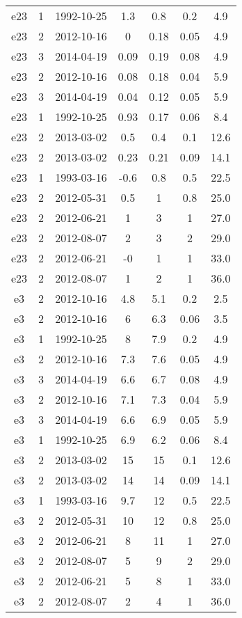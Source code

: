 \begin{table*}[htp]
\begin{tabular}{ccccccc}
e23 & 1 & 1992-10-25 & 1.3 & 0.8 & 0.2 & 4.9 \\
e23 & 2 & 2012-10-16 & 0 & 0.18 & 0.05 & 4.9 \\
e23 & 3 & 2014-04-19 & 0.09 & 0.19 & 0.08 & 4.9 \\
e23 & 2 & 2012-10-16 & 0.08 & 0.18 & 0.04 & 5.9 \\
e23 & 3 & 2014-04-19 & 0.04 & 0.12 & 0.05 & 5.9 \\
e23 & 1 & 1992-10-25 & 0.93 & 0.17 & 0.06 & 8.4 \\
e23 & 2 & 2013-03-02 & 0.5 & 0.4 & 0.1 & 12.6 \\
e23 & 2 & 2013-03-02 & 0.23 & 0.21 & 0.09 & 14.1 \\
e23 & 1 & 1993-03-16 & -0.6 & 0.8 & 0.5 & 22.5 \\
e23 & 2 & 2012-05-31 & 0.5 & 1 & 0.8 & 25.0 \\
e23 & 2 & 2012-06-21 & 1 & 3 & 1 & 27.0 \\
e23 & 2 & 2012-08-07 & 2 & 3 & 2 & 29.0 \\
e23 & 2 & 2012-06-21 & -0 & 1 & 1 & 33.0 \\
e23 & 2 & 2012-08-07 & 1 & 2 & 1 & 36.0 \\
e3 & 2 & 2012-10-16 & 4.8 & 5.1 & 0.2 & 2.5 \\
e3 & 2 & 2012-10-16 & 6 & 6.3 & 0.06 & 3.5 \\
e3 & 1 & 1992-10-25 & 8 & 7.9 & 0.2 & 4.9 \\
e3 & 2 & 2012-10-16 & 7.3 & 7.6 & 0.05 & 4.9 \\
e3 & 3 & 2014-04-19 & 6.6 & 6.7 & 0.08 & 4.9 \\
e3 & 2 & 2012-10-16 & 7.1 & 7.3 & 0.04 & 5.9 \\
e3 & 3 & 2014-04-19 & 6.6 & 6.9 & 0.05 & 5.9 \\
e3 & 1 & 1992-10-25 & 6.9 & 6.2 & 0.06 & 8.4 \\
e3 & 2 & 2013-03-02 & 15 & 15 & 0.1 & 12.6 \\
e3 & 2 & 2013-03-02 & 14 & 14 & 0.09 & 14.1 \\
e3 & 1 & 1993-03-16 & 9.7 & 12 & 0.5 & 22.5 \\
e3 & 2 & 2012-05-31 & 10 & 12 & 0.8 & 25.0 \\
e3 & 2 & 2012-06-21 & 8 & 11 & 1 & 27.0 \\
e3 & 2 & 2012-08-07 & 5 & 9 & 2 & 29.0 \\
e3 & 2 & 2012-06-21 & 5 & 8 & 1 & 33.0 \\
e3 & 2 & 2012-08-07 & 2 & 4 & 1 & 36.0 \\

\end{tabular}
\end{table*}
